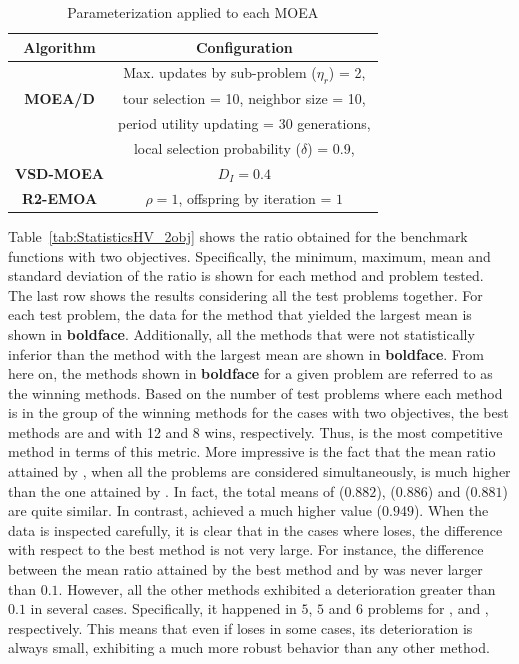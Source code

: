 %
\begin{table}[t]
\centering
\caption{ Parameterization applied to each MOEA}
\label{tab:Parametrization}
\begin{tabular}{c|c}
\hline
\textbf{Algorithm} & \textbf{Configuration} \\ \hline
\multirow{3}{*}{\textbf{MOEA/D}} &Max. updates by sub-problem ($\eta_r$) = 2, \\
 & tour selection = 10,   neighbor size = 10, \\
 & period utility updating = 30 generations, \\ 
 & local selection probability ($\delta$) = 0.9,\\ \hline
\textbf{VSD-MOEA} & $D_I=0.4$ \\ \hline
\textbf{R2-EMOA} & $\rho=1$, offspring by iteration = $1$ \\ \hline
\end{tabular}
\end{table}




Table~\ref{tab:StatisticsHV_2obj} shows the \HV{} ratio obtained for the benchmark functions
with two objectives.
%
Specifically, the minimum, maximum, mean and standard deviation of the \HV{} ratio is shown for each method and problem tested.
%
The last row shows the results considering all the test problems together.
%
For each test problem, the data for the method that yielded the largest mean is shown in {\bf boldface}.
%
Additionally, all the methods that were not statistically inferior than the method with the largest mean 
are shown in {\bf boldface}.
%
From here on, the methods shown in {\bf boldface} for a given problem are referred to as the winning methods.
%
Based on the number of test problems where each method is in the group of the winning methods for the cases 
with two objectives, the best methods are \VSDMOEA{} and \RMOEA{} with 12 and 8 wins, respectively.
%
Thus, \VSDMOEA{} is the most competitive method in terms of this metric.
%
More impressive is the fact that the mean \HV{} ratio attained by \VSDMOEA{}, when all the problems are considered simultaneously, is much higher
than the one attained by \RMOEA{}.
%
In fact, the total means of \RMOEA{} ($0.882$), \NSGAII{} ($0.886$) and \MOEAD{} ($0.881$) are quite similar.
%
In contrast, \VSDMOEA{} achieved a much higher value ($0.949$).
%
When the data is inspected carefully, it is clear that in the cases where \VSDMOEA{} loses, the difference with respect to the
best method is not very large.
%
For instance, the difference between the mean \HV{} ratio attained by the best method and by \VSDMOEA{} was never larger
than $0.1$.
%
However, all the other methods exhibited a deterioration greater than $0.1$ in several cases.
%
Specifically, it happened in $5$, $5$ and $6$ problems for \RMOEA{}, \NSGAII{} and \MOEAD{}, respectively.
%
This means that even if \VSDMOEA{} loses in some cases, its deterioration is always small, exhibiting a much more 
robust behavior than any other method.

